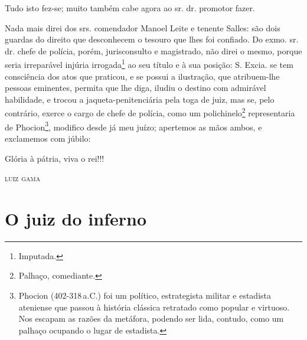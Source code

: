 {\begin{flushright}
Tudo isto fez-se; muito também cabe agora ao sr. dr. promotor fazer.

Nada mais direi dos srs. comendador Manoel Leite e tenente Salles: são
dois guardas do direito que desconhecem o tesouro que lhes foi confiado.
Do exmo. sr. dr. chefe de polícia, porém, jurisconsulto e magistrado,
não direi o mesmo, porque seria irreparável injúria irrogada\footnote{
  Imputada.} ao seu título e à sua posição: S. Excia. se tem consciência
dos atos que praticou, e se possui a ilustração, que atribuem-lhe
pessoas eminentes, permita que lhe diga, iludiu o destino com admirável
habilidade, e trocou a jaqueta-penitenciária pela toga de juiz, mas se,
pelo contrário, exerce o cargo de chefe de polícia, como um
polichinelo\footnote{ Palhaço, comediante.} representaria de
Phocion\footnote{ Phocion (402-318\,a.C.) foi um político,
  estrategista militar e estadista ateniense que passou à história
  clássica retratado como popular e virtuoso. Nos escapam as razões da
  metáfora, podendo ser lida, contudo, como um palhaço ocupando o lugar
  de estadista.}, modifico desde já meu juízo; apertemos as mãos ambos,
e exclamemos com júbilo:

Glória à pátria, viva o rei!!!

\begin{flushright}
\textsc{luiz gama}
\end{flushright}


\part{O juiz do inferno}


\end{flushright}}
